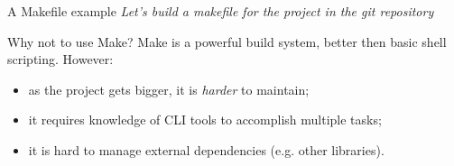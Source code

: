 \begin{frame}{A Makefile example}
    \centering
    \textit{Let's build a makefile for the project in the git repository}
\end{frame}

\begin{frame}{Why not to use Make?}
    Make is a powerful build system, better then basic shell scripting. However:
    \begin{itemize}
        \item as the project gets bigger, it is \textit{harder} to maintain;
        \item it requires knowledge of CLI tools to accomplish multiple tasks;
        \item it is hard to manage external dependencies (e.g. other libraries).
    \end{itemize}

\end{frame}

